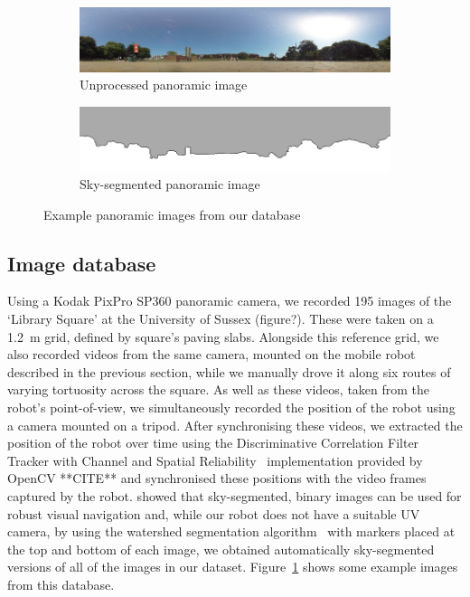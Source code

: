 \documentclass[letterpaper]{article}
\begin{document}
\begin{figure}[t]
    \begin{subfigure}[b]{\columnwidth}
        \includegraphics[width=\columnwidth]{figures/360_240.jpg}
        \caption{Unprocessed panoramic image}
    \end{subfigure}
    \begin{subfigure}[b]{\columnwidth}
        \includegraphics[width=\columnwidth]{figures/360_240_mask.png}
        \caption{Sky-segmented panoramic image}
    \end{subfigure}
    \caption{Example panoramic images from our database}
    \label{fig:database_images}
\end{figure}

\subsection{Image database}
\label{sec:image_database}
Using a Kodak PixPro SP360 panoramic camera, we recorded 195 images of the ‘Library Square’ at the University of Sussex (figure?). 
These were taken on a \SI{1.2}{\metre} grid, defined by square’s paving slabs. 
Alongside this reference grid, we also recorded videos from the same camera, mounted on the mobile robot described in the previous section, while we manually drove it along six routes of varying tortuosity across the square. 
As well as these videos, taken from the robot’s point-of-view, we simultaneously recorded the position of the robot using a camera mounted on a tripod. 
After synchronising these videos, we extracted the position of the robot over time using the Discriminative Correlation Filter Tracker with Channel and Spatial Reliability~\citep{Lukezic2018} implementation provided by OpenCV **CITE** and synchronised these positions with the video frames captured by the robot. 
\citet{Stone2014} showed that sky-segmented, binary images can be used for robust visual navigation and, while our robot does not have a suitable UV camera, by using the watershed segmentation algorithm~\citep{Beucher1979} with markers placed at the top and bottom of each image, we obtained automatically sky-segmented versions of all of the images in our dataset.
Figure~\ref{fig:database_images} shows some example images from this database.
\end{document}
